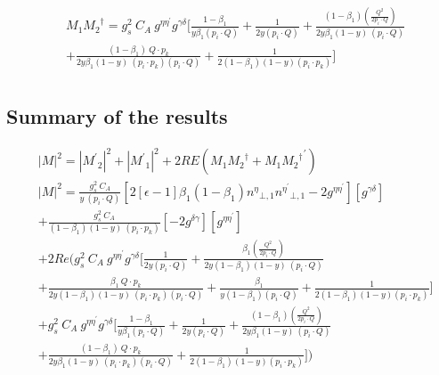 \begin{equation}
\begin{split}
&M_1{M_2}^{\dagger}=g_s^2\: C_A\:g^{{{\eta}}{{\eta}^{\prime}}}g^{{{\gamma}}{{\delta}}}[\frac{1-\beta_1}{y\beta_1 (p_i \cdot Q)}+\frac{1}{2y(p_i \cdot Q)}+\frac{(1-\beta_1)(\frac{Q^2}{2p_i \cdot Q})}{2y\beta_1 (1-y)\:(p_i \cdot Q)}\\
&+\frac{(1-\beta_1)\:Q\cdot p_k}{2y\beta_1 (1-y)\:(p_i \cdot p_k)(p_i \cdot Q)}+\frac{1}{2(1-\beta_1)(1-y) (p_i \cdot p_k)}]\\
\end{split}
\end{equation}


\subsection*{Summary of the results}

\begin{equation}
\begin{split}
&|M|^{2}=|{M^{\prime}}_2|^{2}+|{M^{\prime}}_1|^{2}+2RE(M_1{M_2}^{\dagger}+{M_1{M_2}^{\dagger}}^{\prime})\\
&{|{M}|}^2 =\frac{g_s^2\: C_A}{y\:(p_i\cdot Q)}[2[\epsilon-1]{\beta_1}(1-\beta_1){n^{{\eta}}}_{\bot,1}{n^{{\eta}^{\prime}}}_{\bot,1}-2g^{{\eta}{{\eta}^{\prime}}}][g^{{\gamma}{{\delta}}}]\\
&+\frac{g_s^2\: C_A}{(1-\beta_1) (1-y)\:(p_i \cdot p_k)}[-2g^{{\delta}{\gamma}}][g^{{\eta}{{\eta}^{\prime}}}]\\
&+2Re(g_s^2\: C_A\:g^{{{\eta}}{{\eta}^{\prime}}}g^{{{\gamma}}{{\delta}}}[\frac{1}{2y(p_i \cdot Q)}+\frac{\beta_1(\frac{Q^2}{2p_i \cdot Q})}{2y(1-\beta_1) (1-y)\:(p_i \cdot Q)}\\
&+\frac{\beta_1\:Q\cdot p_k}{2y(1-\beta_1) (1-y)\:(p_i \cdot p_k)(p_i \cdot Q)}+\frac{\beta_1}{y(1-\beta_1) (p_i \cdot Q)}+\frac{1}{2(1-\beta_1)(1-y) (p_i \cdot p_k)}]\\
&+g_s^2\: C_A\:g^{{{\eta}}{{\eta}^{\prime}}}g^{{{\gamma}}{{\delta}}}[\frac{1-\beta_1}{y\beta_1 (p_i \cdot Q)}+\frac{1}{2y(p_i \cdot Q)}+\frac{(1-\beta_1)(\frac{Q^2}{2p_i \cdot Q})}{2y\beta_1 (1-y)\:(p_i \cdot Q)}\\
&+\frac{(1-\beta_1)\:Q\cdot p_k}{2y\beta_1 (1-y)\:(p_i \cdot p_k)(p_i \cdot Q)}+\frac{1}{2(1-\beta_1)(1-y) (p_i \cdot p_k)}])  \\
\end{split}
\end{equation}



